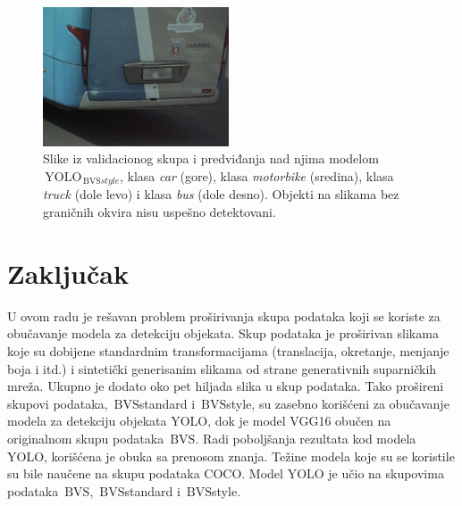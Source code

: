 \documentclass[12pt,oneside]{memoir}
\newcommand{\yolo}{\ensuremath{\,\textrm{YOLO}}}
\newcommand{\bvs}{\ensuremath{\,\textrm{BVS}}}
\begin{document}
\begin{figure}[!htbp]
  \includegraphics[width=0.49\textwidth]{matfmaster/yolo/v4/stylegan_augmentation/bus_0.jpg}
\caption{Slike iz validacionog skupa i predviđanja nad njima modelom $\yolo_{\bvs{style}}$, klasa \textit{car} (gore), klasa \textit{motorbike} (sredina), klasa \textit{truck} (dole levo) i klasa \textit{bus} (dole desno). Objekti na slikama bez graničnih okvira nisu uspešno detektovani.}
\label{fig:section4_yolo4styleaug_images}
\end{figure}




\chapter{Zaključak}
\label{section6}
U ovom radu je rešavan problem proširivanja skupa podataka koji se koriste za obučavanje modela za detekciju objekata. Skup podataka je proširivan slikama koje su dobijene standardnim transformacijama (translacija, okretanje, menjanje boja i itd.) i sintetički generisanim slikama od strane generativnih suparničkih mreža. Ukupno je dodato oko pet hiljada slika u skup podataka. Tako prošireni skupovi podataka, \bvs{standard} i \bvs{style}, su zasebno korišćeni za obučavanje modela za detekciju objekata YOLO, dok je model VGG16 obučen na originalnom skupu podataka \bvs.
Radi poboljšanja rezultata kod modela YOLO, korišćena je obuka sa prenosom znanja.
Težine modela koje su se koristile su bile naučene na skupu podataka COCO. Model YOLO je učio na skupovima podataka \bvs, \bvs{standard} i \bvs{style}.
\end{document}
